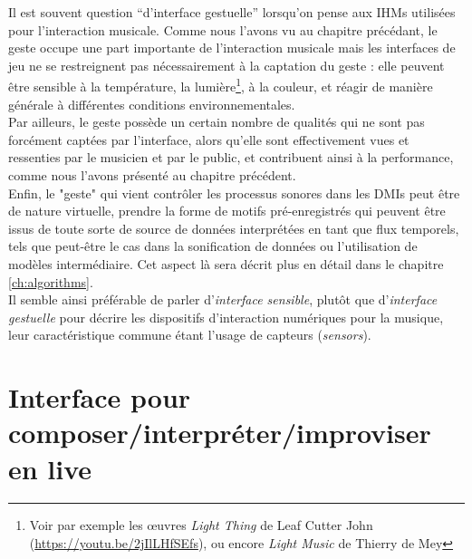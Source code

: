 \noindent Il est souvent question ``d'interface gestuelle'' lorsqu'on pense aux \glspl{IHM} utilisées pour l'interaction musicale. Comme nous l'avons vu au chapitre précédant, le geste occupe une part importante de l'interaction musicale mais les interfaces de jeu ne se restreignent pas nécessairement à la captation du geste : elle peuvent être sensible à la température, la lumière\footnote{Voir par exemple les œuvres \textit{Light Thing} de Leaf Cutter John (\url{https://youtu.be/2jIlLHfSEfs}), ou encore \textit{Light Music} de Thierry de Mey}, à la couleur, et réagir de manière générale à différentes conditions environnementales.\\
\indent Par ailleurs, le geste possède un certain nombre de qualités qui ne sont pas forcément captées par l'interface, alors qu'elle sont effectivement vues et ressenties par le musicien et par le public, et contribuent ainsi à la performance, comme nous l'avons présenté au chapitre précédent.\\
\indent Enfin, le "geste" qui vient contrôler les processus sonores dans les \glspl{DMI} peut être de nature virtuelle, prendre la forme de motifs pré-enregistrés qui peuvent être issus de toute sorte de source de données interprétées en tant que flux temporels, tels que peut-être le cas dans la sonification de données ou l'utilisation de modèles intermédiaire. Cet aspect là sera décrit plus en détail dans le chapitre \ref{ch:algorithms}.\\
\indent Il semble ainsi préférable de parler d'\textit{interface sensible}, plutôt que d'\textit{interface gestuelle} pour décrire les dispositifs d'interaction numériques pour la musique, leur caractéristique commune étant l'usage de capteurs (\textit{sensors}).


\section{Interface pour composer/interpréter/improviser en live}

